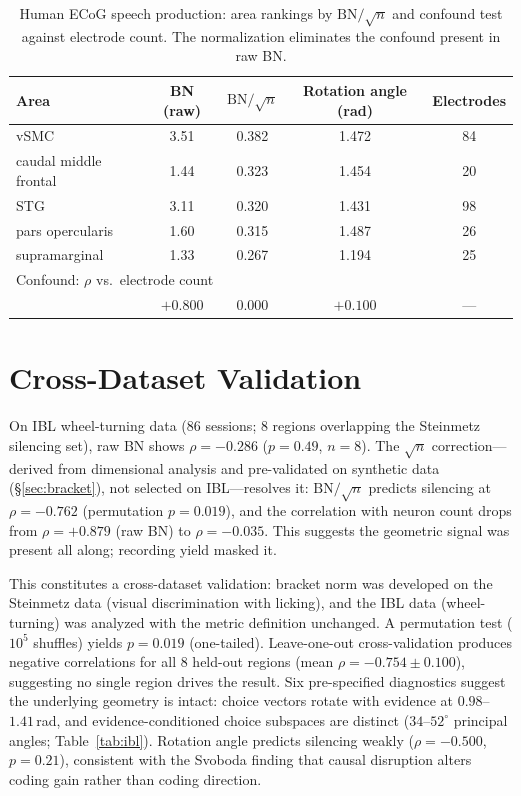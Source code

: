 \documentclass{article}
\begin{document}
\begin{table}[t]
\centering
\caption{Human ECoG speech production: area rankings by $\text{BN}/\!\sqrt{n}$ and confound test against electrode count. The normalization eliminates the confound present in raw BN.}
\label{tab:ecog}
\small
\begin{tabular}{lcccc}
\toprule
Area & BN (raw) & $\text{BN}/\!\sqrt{n}$ & Rotation angle (rad) & Electrodes \\
\midrule
vSMC & 3.51 & 0.382 & 1.472 & 84 \\
caudal middle frontal & 1.44 & 0.323 & 1.454 & 20 \\
STG & 3.11 & 0.320 & 1.431 & 98 \\
pars opercularis & 1.60 & 0.315 & 1.487 & 26 \\
supramarginal & 1.33 & 0.267 & 1.194 & 25 \\
\midrule
\multicolumn{5}{l}{Confound: $\rho$ vs.\ electrode count} \\
\midrule
 & $+0.800$ & $0.000$ & $+0.100$ & --- \\
\bottomrule
\end{tabular}
\end{table}

\section{Cross-Dataset Validation}
\label{sec:scope}

On IBL wheel-turning data (86 sessions; 8 regions overlapping the Steinmetz silencing set), raw BN shows $\rho = -0.286$ ($p = 0.49$, $n = 8$). The $\sqrt{n}$ correction---derived from dimensional analysis and pre-validated on synthetic data (\S\ref{sec:bracket}), not selected on IBL---resolves it: $\text{BN}/\!\sqrt{n}$ predicts silencing at $\rho = -0.762$ (permutation $p = 0.019$), and the correlation with neuron count drops from $\rho = +0.879$ (raw BN) to $\rho = -0.035$. This suggests the geometric signal was present all along; recording yield masked it.

This constitutes a cross-dataset validation: bracket norm was developed on the Steinmetz data (visual discrimination with licking), and the IBL data (wheel-turning) was analyzed with the metric definition unchanged. A permutation test ($10^5$ shuffles) yields $p = 0.019$ (one-tailed). Leave-one-out cross-validation produces negative correlations for all 8 held-out regions (mean $\rho = -0.754 \pm 0.100$), suggesting no single region drives the result. Six pre-specified diagnostics suggest the underlying geometry is intact: choice vectors rotate with evidence at $0.98$--$1.41$\,rad, and evidence-conditioned choice subspaces are distinct ($34$--$52^\circ$ principal angles; Table~\ref{tab:ibl}). Rotation angle predicts silencing weakly ($\rho = -0.500$, $p = 0.21$), consistent with the Svoboda finding that causal disruption alters coding gain rather than coding direction.
\end{document}
